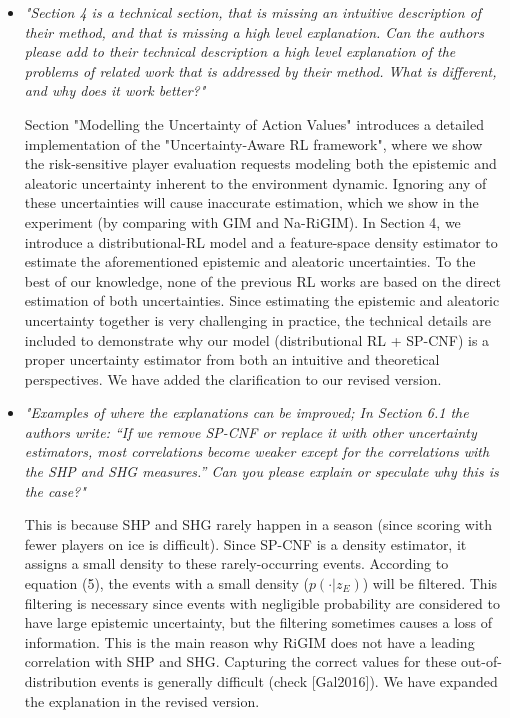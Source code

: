 \documentclass[letterpaper]{article} %
\begin{document}
\begin{itemize}
    \item {\it "Section 4 is a technical section, that is missing an intuitive description of their method, and that is missing a high level explanation. Can the authors please add to their technical description a high level explanation of the problems of related work that is addressed by their method. What is different, and why does it work better?"}

    Section "Modelling the Uncertainty of Action Values" introduces a detailed implementation of the "Uncertainty-Aware RL framework", where we show the risk-sensitive player evaluation requests modeling both the epistemic and aleatoric uncertainty inherent to the environment dynamic. Ignoring any of these uncertainties will cause inaccurate estimation, which we show in the experiment (by comparing with GIM and Na-RiGIM). In Section 4, we introduce a distributional-RL model and a feature-space density estimator to estimate the aforementioned epistemic and aleatoric uncertainties. To the best of our knowledge, none of the previous RL works are based on the direct estimation of both uncertainties. Since estimating the epistemic and aleatoric uncertainty together is very challenging in practice, the technical details are included to demonstrate why our model (distributional RL + SP-CNF) is a proper uncertainty estimator from both an intuitive and theoretical perspectives. We have added the clarification to our revised version.
    \medskip

    \item {\it "Examples of where the explanations can be improved; In Section 6.1 the authors write: “If we remove SP-CNF or replace it with other uncertainty estimators, most correlations become weaker except for the correlations with the SHP and SHG measures.” Can you please explain or speculate why this is the case?"}

    This is because SHP and SHG rarely happen in a season (since scoring with fewer players on ice is difficult). Since SP-CNF is a density estimator, it assigns a small density to these rarely-occurring events. According to equation (5), the events with a small density ($p(\cdot|{z}_{E})$) will be filtered. This filtering is necessary since events with negligible probability are considered to have large epistemic uncertainty, but the filtering sometimes causes a loss of information. This is the main reason why RiGIM does not have a leading correlation with SHP and SHG. Capturing the correct values for these out-of-distribution events is generally difficult (check [Gal2016]). We have expanded the explanation in the revised version.\medskip


\end{itemize}
\end{document}
